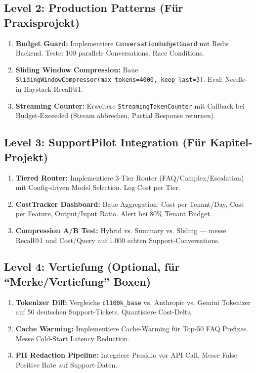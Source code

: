 \subsection{Level 2: Production Patterns (Für Praxisprojekt)}
\label{sec:ex_level2}

\begin{enumerate}[leftmargin=*]
  \item \textbf{Budget Guard:} Implementiere \texttt{ConversationBudgetGuard} mit Redis Backend. Teste: 100 parallele Conversations, Race Conditions.
  \item \textbf{Sliding Window Compression:} Baue \texttt{SlidingWindowCompressor(max\_tokens=4000, keep\_last=3)}. Eval: Needle-in-Haystack Recall@1.
  \item \textbf{Streaming Counter:} Erweitere \texttt{StreamingTokenCounter} mit Callback bei Budget-Exceeded (Stream abbrechen, Partial Response returnen).
\end{enumerate}

\subsection{Level 3: SupportPilot Integration (Für Kapitel-Projekt)}
\label{sec:ex_level3}

\begin{enumerate}[leftmargin=*]
  \item \textbf{Tiered Router:} Implementiere 3-Tier Router (FAQ/Complex/Escalation) mit Config-driven Model Selection. Log Cost per Tier.
  \item \textbf{CostTracker Dashboard:} Baue Aggregation: Cost per Tenant/Day, Cost per Feature, Output/Input Ratio. Alert bei 80\% Tenant Budget.
  \item \textbf{Compression A/B Test:} Hybrid vs. Summary vs. Sliding --- messe Recall@1 und Cost/Query auf 1.000 echten Support-Conversations.
\end{enumerate}

\subsection{Level 4: Vertiefung (Optional, für ``Merke/Vertiefung'' Boxen)}
\label{sec:ex_level4}

\begin{enumerate}[leftmargin=*]
  \item \textbf{Tokenizer Diff:} Vergleiche \texttt{cl100k\_base} vs. Anthropic vs. Gemini Tokenizer auf 50 deutschen Support-Tickets. Quantisiere Cost-Delta.
  \item \textbf{Cache Warming:} Implementiere Cache-Warming für Top-50 FAQ Prefixes. Messe Cold-Start Latency Reduction.
  \item \textbf{PII Redaction Pipeline:} Integriere Presidio vor API Call. Messe False Positive Rate auf Support-Daten.
\end{enumerate}

